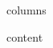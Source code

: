 \documentclass[10pt,{{ orientation }}]{article}
\begin{document}
\begin{multicols*}{ {{ columns }} } %
\raggedright

{{content}} 

\end{multicols*}
\end{document}
